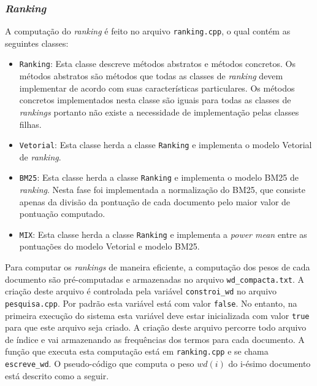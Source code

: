 \documentclass[a4paper]{article}
\begin{document}
\subsubsection{\emph{Ranking}}






A computação do \emph{ranking} é feito no arquivo \texttt{ranking.cpp}, o qual 
contém as seguintes classes: 
    \begin{itemize}
         \item  \texttt{Ranking}: Esta classe descreve métodos abstratos e métodos 
	     concretos. Os métodos abstratos são métodos que todas as classes de 
	     \emph{ranking} devem implementar de acordo com suas características 
	     particulares. Os métodos concretos implementados nesta classe são iguais 
	     para todas as classes de \emph{rankings} portanto não existe a necessidade 
	     de implementação pelas classes filhas.
	 \item \texttt{Vetorial}: Esta classe herda a classe \texttt{Ranking} e 
	     implementa o modelo Vetorial de \emph{ranking}\cite{Baeza1999}.
	 \item \texttt{BM25}: Esta classe herda a classe \texttt{Ranking} e 
	     implementa o modelo BM25 de \emph{ranking}\cite{Baeza1999}. Nesta 
	     fase foi implementada a normalização do BM25, que consiste apenas 
	     da divisão da pontuação  de cada documento pelo maior valor de pontuação 
	     computado.
	 \item\texttt{MIX}: Esta classe herda a classe \texttt{Ranking} e implementa 
	     a \emph{power mean}\cite{powermean} entre as pontuações do modelo Vetorial e 
	     modelo BM25.
     \end{itemize}

 Para computar os \emph{rankings} de maneira eficiente, a computação dos pesos de cada 
 documento são pré-computadas e armazenadas no arquivo \texttt{wd\_compacta.txt}. A criação 
 deste arquivo é controlada pela variável \texttt{constroi\_wd} no arquivo \texttt{pesquisa.cpp}. 
 Por padrão esta variável está com valor \texttt{false}. No entanto, na primeira execução 
 do sistema esta variável deve estar inicializada com valor \texttt{true} para que este 
 arquivo seja criado. A criação deste arquivo percorre todo arquivo de índice e 
 vai armazenando as frequências dos termos para cada documento. A função que 
 executa esta computação está em \texttt{ranking.cpp} e se chama 
 \texttt{escreve\_wd}. O pseudo-código que computa o peso $wd(i)$ do i-ésimo documento 
 está descrito como a seguir.
\end{document}
